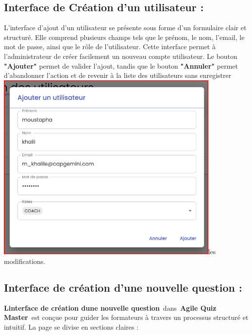 \documentclass[12pt,a4paper,twoside,openright]{report}
\begin{document}
\hypertarget{interface-de-cruxe9ation-dun-utilisateur}{%
\subsection{Interface de Création d'un utilisateur
:}\label{interface-de-cruxe9ation-dun-utilisateur}}

L'interface d'ajout d'un utilisateur se présente sous forme d'un
formulaire clair et structuré. Elle comprend plusieurs champs tels que
le prénom, le nom, l'email, le mot de passe, ainsi que le rôle de
l'utilisateur. Cette interface permet à l'administrateur de créer
facilement un nouveau compte utilisateur. Le bouton \textbf{"Ajouter"}
permet de valider l'ajout, tandis que le bouton \textbf{"Annuler"}
permet d'abandonner l'action et de revenir à la liste des utilisateurs
sans enregistrer
\includegraphics[width=4.38217in,height=3.72241in]{latex_media/media/image54.png}les
modifications.

\hypertarget{interface-de-cruxe9ation-dune-nouvelle-question}{%
\subsection{Interface de création d'une nouvelle question
:}\label{interface-de-cruxe9ation-dune-nouvelle-question}}

\textbf{L\textquotesingle interface de création d\textquotesingle une
nouvelle question}~dans~\textbf{Agile Quiz Master}~est conçue pour
guider les formateurs à travers un processus structuré et intuitif. La
page se divise en sections claires :
\end{document}
